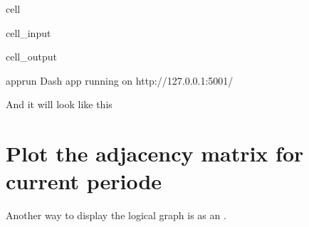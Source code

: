 \documentclass[letterpaper,10pt,english]{jupyterBook}
\begin{document}
\begin{sphinxuseclass}{cell}\begin{sphinxVerbatimInput}

\begin{sphinxuseclass}{cell_input}
\begin{sphinxVerbatim}[commandchars=\\\{\}]
     
          
   
\end{sphinxVerbatim}

\end{sphinxuseclass}\end{sphinxVerbatimInput}
\begin{sphinxVerbatimOutput}

\begin{sphinxuseclass}{cell_output}
\begin{sphinxVerbatim}[commandchars=\\\{\}]
apprun
Dash app running on http://127.0.0.1:5001/
\end{sphinxVerbatim}

\end{sphinxuseclass}\end{sphinxVerbatimOutput}

\end{sphinxuseclass}
\sphinxAtStartPar
And it will look like this

\sphinxAtStartPar
{}


\section{Plot the adjacency matrix for current periode}
\label{\detokenize{content/howto/structure/Logical_structure:plot-the-adjacency-matrix-for-current-periode}}
\sphinxAtStartPar
Another way to display the logical graph is as an .
\end{document}
